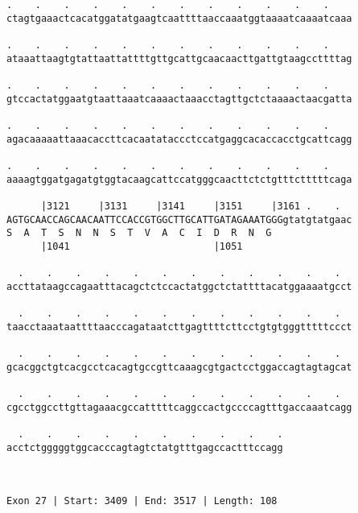 \documentclass{article}
\begin{document}
\begin{Verbatim}
.    .    .    .    .    .    .    .    .    .    .    .    
ctagtgaaactcacatggatatgaagtcaattttaaccaaatggtaaaatcaaaatcaaa
                                                            
.    .    .    .    .    .    .    .    .    .    .    .    
ataaattaagtgtattaattattttgttgcattgcaacaacttgattgtaagccttttag
                                                            
.    .    .    .    .    .    .    .    .    .    .    .    
gtccactatggaatgtaattaaatcaaaactaaacctagttgctctaaaactaacgatta
                                                            
.    .    .    .    .    .    .    .    .    .    .    .    
agacaaaaattaaacaccttcacaatataccctccatgaggcacaccacctgcattcagg
                                                            
.    .    .    .    .    .    .    .    .    .    .    .    
aaaagtggatgagatgtggtacaagcattccatgggcaacttctctgtttctttttcaga
                                                            
      |3121     |3131     |3141     |3151     |3161 .    .  
AGTGCAACCAGCAACAATTCCACCGTGGCTTGCATTGATAGAAATGGGgtatgtatgaac
S  A  T  S  N  N  S  T  V  A  C  I  D  R  N  G              
      |1041                         |1051                   
  
  .    .    .    .    .    .    .    .    .    .    .    .  
accttataagccagaatttacagctctccactatggctctattttacatggaaaatgcct
                                                            
  .    .    .    .    .    .    .    .    .    .    .    .  
taacctaaataattttaacccagataatcttgagttttcttcctgtgtgggtttttccct
                                                            
  .    .    .    .    .    .    .    .    .    .    .    .  
gcacggctgtcacgcctcacagtgccgttcaaagcgtgactcctggaccagtagtagcat
                                                            
  .    .    .    .    .    .    .    .    .    .    .    .  
cgcctggccttgttagaaacgccatttttcaggccactgccccagtttgaccaaatcagg
                                                            
  .    .    .    .    .    .    .    .    .    .
acctctgggggtggcacccagtagtctatgtttgagccactttccagg
                                                
                                                
 
Exon 27 | Start: 3409 | End: 3517 | Length: 108




\end{Verbatim}
\end{document}
